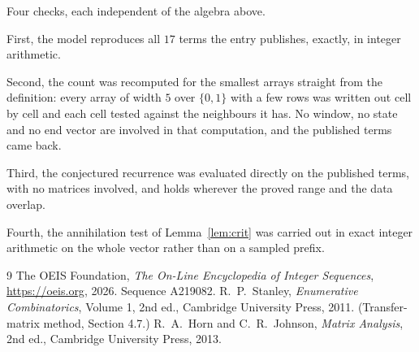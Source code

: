 \documentclass[11pt,a4paper]{article}
\theoremstyle{plain}
\theoremstyle{definition}
\begin{document}
Four checks, each independent of the algebra above.

First, the model reproduces all $17$ terms the entry publishes, exactly, in integer
arithmetic.

Second, the count was recomputed for the smallest arrays straight from the definition: every
array of width $5$ over $\{0,1\}$ with a few rows was written out cell by cell and each cell
tested against the neighbours it has. No window, no state and no end vector are involved in that
computation, and the published terms came back.

Third, the conjectured recurrence was evaluated directly on the published terms, with no
matrices involved, and holds wherever the proved range and the data overlap.

Fourth, the annihilation test of Lemma~\ref{lem:crit} was carried out in exact integer
arithmetic on the whole vector rather than on a sampled prefix.

\begin{thebibliography}{9}
 The OEIS Foundation, \emph{The On-Line Encyclopedia of Integer
Sequences}, \url{https://oeis.org}, 2026. Sequence A219082.
 R.~P.~Stanley, \emph{Enumerative Combinatorics}, Volume 1, 2nd ed.,
Cambridge University Press, 2011. (Transfer-matrix method, Section 4.7.)
 R.~A.~Horn and C.~R.~Johnson, \emph{Matrix Analysis}, 2nd ed., Cambridge
University Press, 2013.
\end{thebibliography}
\end{document}
